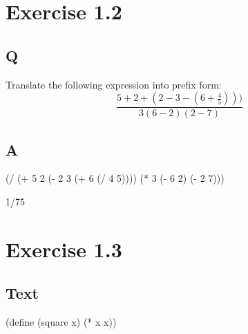 \documentclass[
]{article}
\newenvironment{Shaded}{}{}
\newcommand{\DecValTok}[1]{\textcolor[rgb]{0.25,0.63,0.44}{#1}}
\newcommand{\ExtensionTok}[1]{#1}
\newcommand{\FunctionTok}[1]{\textcolor[rgb]{0.02,0.16,0.49}{#1}}
\newcommand{\NormalTok}[1]{#1}
\newcommand{\OperatorTok}[1]{\textcolor[rgb]{0.40,0.40,0.40}{#1}}
\begin{document}
\hypertarget{exercise-1.2}{%
\section{Exercise 1.2}\label{exercise-1.2}}

\hypertarget{q-1}{%
\subsection{Q}\label{q-1}}

Translate the following expression into prefix form: \[
  \frac{5 + 2 + (2 - 3 - (6 + \frac{4}{5})))}
            {3(6 - 2)(2 - 7)}
\]

\hypertarget{a-1}{%
\subsection{A}\label{a-1}}

\hypertarget{EX1-2}{%
\label{EX1-2}}%
\begin{Shaded}
\begin{Highlighting}[numbers=left,,]
\NormalTok{(}\OperatorTok{/}\NormalTok{ (}\OperatorTok{+} \DecValTok{5} \DecValTok{2}\NormalTok{ (}\OperatorTok{{-}} \DecValTok{2} \DecValTok{3}\NormalTok{ (}\OperatorTok{+} \DecValTok{6}\NormalTok{ (}\OperatorTok{/} \DecValTok{4} \DecValTok{5}\NormalTok{))))}
\NormalTok{   (}\OperatorTok{*} \DecValTok{3}\NormalTok{ (}\OperatorTok{{-}} \DecValTok{6} \DecValTok{2}\NormalTok{) (}\OperatorTok{{-}} \DecValTok{2} \DecValTok{7}\NormalTok{)))}
\end{Highlighting}
\end{Shaded}

1/75

\hypertarget{exercise-1.3}{%
\section{Exercise 1.3}\label{exercise-1.3}}

\hypertarget{text}{%
\subsection{Text}\label{text}}

\hypertarget{square}{%
\label{square}}%
\begin{Shaded}
\begin{Highlighting}[numbers=left,,]
\NormalTok{(}\ExtensionTok{define}\FunctionTok{ }\NormalTok{(square x)}
\NormalTok{  (}\OperatorTok{*}\NormalTok{ x x))}
\end{Highlighting}
\end{Shaded}
\end{document}
